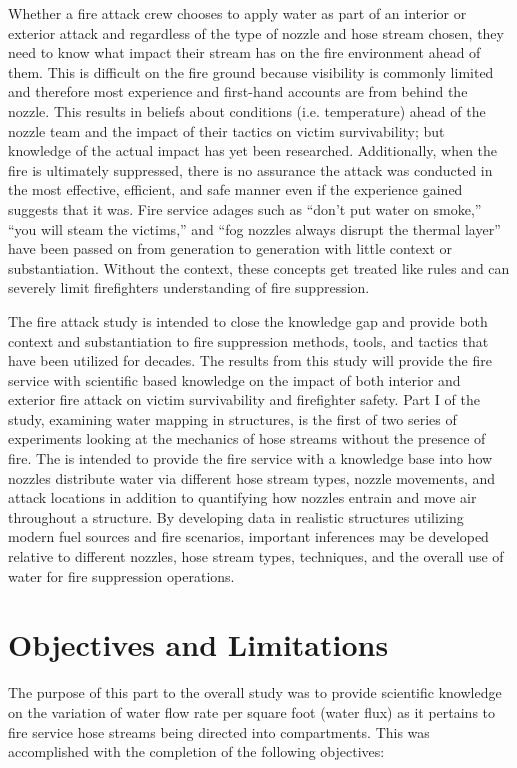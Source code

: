 \documentclass[12pt,oneside]{book}
\begin{document}
Whether a fire attack crew chooses to apply water as part of an interior or exterior attack and regardless of the type of nozzle and hose stream chosen, they need to know what impact their stream has on the fire environment ahead of them. This is difficult on the fire ground because visibility is commonly limited and therefore most experience and first-hand accounts are from behind the nozzle. This results in beliefs about conditions (i.e. temperature) ahead of the nozzle team and the impact of their tactics on victim survivability; but knowledge of the actual impact has yet been researched. Additionally, when the fire is ultimately suppressed, there is no assurance the attack was conducted in the most effective, efficient, and safe manner even if the experience gained suggests that it was. Fire service adages such as ``don't put water on smoke,'' ``you will steam the victims,'' and ``fog nozzles always disrupt the thermal layer'' have been passed on from generation to generation with little context or substantiation. Without the context, these concepts get treated like rules and can severely limit firefighters understanding of fire suppression.

The fire attack study is intended to close the knowledge gap and provide both context and substantiation to fire suppression methods, tools, and tactics that have been utilized for decades. The results from this study will provide the fire service with scientific based knowledge on the impact of both interior and exterior fire attack on victim survivability and firefighter safety. Part I of the study, examining water mapping in structures, is the first of two series of experiments looking at the mechanics of hose streams without the presence of fire. The is intended to provide the fire service with a knowledge base into how nozzles distribute water via different hose stream types, nozzle movements, and attack locations in addition to quantifying how nozzles entrain and move air throughout a structure. By developing data in realistic structures utilizing modern fuel sources and fire scenarios, important inferences may be developed relative to different nozzles, hose stream types, techniques, and the overall use of water for fire suppression operations.

\chapter{Objectives and Limitations}

The purpose of this part to the overall study was to provide scientific knowledge on the variation of water flow rate per square foot (water flux) as it pertains to fire service hose streams being directed into compartments. This was accomplished with the completion of the following objectives:
\end{document}
